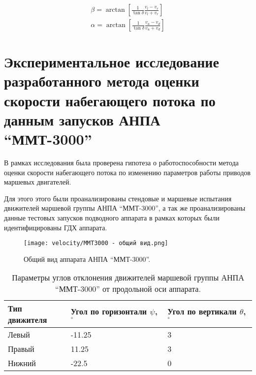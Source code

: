 \begin{gather}
    \beta = \arctan{\left[\frac{1}{\tan{\delta}}\frac{v_l-v_r}{v_l+v_r}\right]} \\
    \alpha = \arctan{\left[\frac{1}{\tan{\delta}}\frac{v_u-v_d}{v_u+v_d}\right]}
\end{gather}





\section{Экспериментальное исследование разработанного метода оценки скорости набегающего потока по данным запусков АНПА ``ММТ-3000''}
В рамках исследования была проверена гипотеза о работоспособности метода оценки скорости набегающего потока по изменению параметров работы приводов маршевых двигателей.

Для этого этого были проанализированы стендовые и маршевые испытания движителей маршевой группы АНПА ``ММТ-3000'', а так же проанализированы данные тестовых запусков подводного аппарата в рамках которых были идентифицированы ГДХ аппарата.

\begin{figure}[ht]
    \centering
    \texttt{[image: velocity/MMT3000 - общий вид.png]}
    \caption{Общий вид аппарата АНПА ``ММТ-3000''.}
    \label{fig:mmt-3000}
\end{figure}

\begin{table}
    \caption{Параметры углов отклонения движителей маршевой группы АНПА ``ММТ-3000'' от продольной оси аппарата.}
    \label{tab:mmt3000_propulsion_angles}
    \centering
    \begin{tabular}{lll}
        \toprule
        Тип движителя & Угол по горизонтали $\psi$, $^{\circ}$  & Угол по вертикали $\theta$, $^{\circ}$ \\
        \midrule
        Левый  & -11.25 & 3 \\
        Правый &  11.25 & 3 \\
        Нижний &  -22.5 & 0 \\
        \bottomrule
    \end{tabular}
\end{table}

